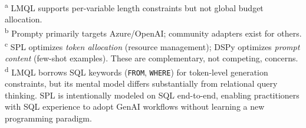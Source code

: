 \documentclass[11pt,a4paper]{article}
\begin{document}
\begin{table}[h]
\centering
\caption{Feature comparison of LLM prompt management approaches.}
\label{tab:comparison}

\smallskip
\textsuperscript{a} LMQL supports per-variable length constraints but not global budget allocation. \\
\textsuperscript{b} Prompty primarily targets Azure/OpenAI; community adapters exist for others. \\
\textsuperscript{c} SPL optimizes \emph{token allocation} (resource management); DSPy optimizes \emph{prompt content} (few-shot examples). These are complementary, not competing, concerns. \\
\textsuperscript{d} LMQL borrows SQL keywords (\texttt{FROM}, \texttt{WHERE}) for token-level generation constraints, but its mental model differs substantially from relational query thinking. SPL is intentionally modeled on SQL end-to-end, enabling practitioners with SQL experience to adopt GenAI workflows without learning a new programming paradigm.
\end{table}
\end{document}
